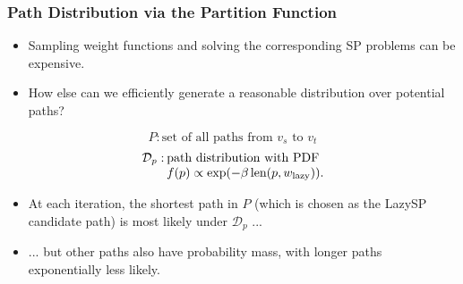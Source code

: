 \begin{frame}
   \frametitle{Path Distribution via the Partition Function}
   
   \begin{itemize}
   \item
   Sampling weight functions and solving the corresponding SP problems
   can be expensive.
   
   \pause
   \item
   How else can we efficiently generate a reasonable distribution
   over potential paths?
   \end{itemize}
   
   \pause
   \begin{equation*}
      P: \mbox{set of all paths from $v_s$ to $v_t$}
   \end{equation*}%
   \pause%
   \vspace{-0.3cm}
   \begin{equation*}
      \arraycolsep=1pt
      \begin{array}{ll}
      \mathcal{D}_p : & \mbox{path distribution with PDF } \\
      & f(p) \propto \exp( - \beta \, \mbox{len}(p, w_{\ms{lazy}}) ). \\
      \end{array}
   \end{equation*}
   
   \pause
   \vspace{0.3cm}
   \begin{itemize}
   \item At each iteration,
   the shortest path in $P$
   (which is chosen as the LazySP candidate path)
   is most likely under $\mathcal{D}_p$ ...
   
   \pause
   \item ... but other paths also have probability mass,
      with longer paths exponentially less likely.
   \end{itemize}
   
\end{frame}


